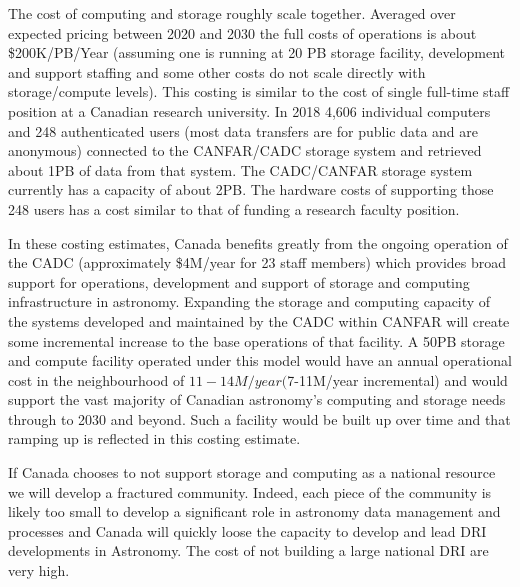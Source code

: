 \documentclass[11pt]{article}
\begin{document}
\begin{lrptextbox} 

The cost of computing and storage roughly scale together.   Averaged over expected pricing between 2020 and 2030 the full costs of operations is about \$200K/PB/Year (assuming one is running at 20 PB storage facility,  development and support staffing and some other costs do not scale directly with storage/compute levels). This costing is similar to the cost of single full-time staff position at a Canadian research university.  In 2018 4,606 individual computers and 248 authenticated users (most data transfers are for public data and are anonymous) connected to the CANFAR/CADC storage system and retrieved about 1PB of data from that system.  The CADC/CANFAR  storage system currently has a capacity of about 2PB.  The hardware costs of supporting those 248 users has a cost similar to that of funding a research faculty position.  

In these costing estimates, Canada benefits greatly from the ongoing operation of the CADC (approximately \$4M/year for 23 staff members) which provides broad support for operations, development and support of storage and computing infrastructure in astronomy.   Expanding the storage and computing capacity of the systems developed and maintained by the CADC within CANFAR will create some incremental increase to the base operations of that facility.   A 50PB storage and compute facility operated under this model would have an annual operational cost in the neighbourhood of $11-14M/year ($7-11M/year incremental) and would support the vast majority of Canadian astronomy's computing and storage needs through to 2030 and beyond.  Such a facility would be built up over time and that ramping up is reflected in this costing estimate.

If Canada chooses to not support storage and computing as a national resource we will develop a fractured community.  Indeed, each piece of the community is likely too small to develop a significant role in astronomy data management and processes and Canada will quickly loose the capacity to develop and lead DRI developments in Astronomy.  The cost of not building a large national DRI are very high.

\end{lrptextbox}
\end{document}

